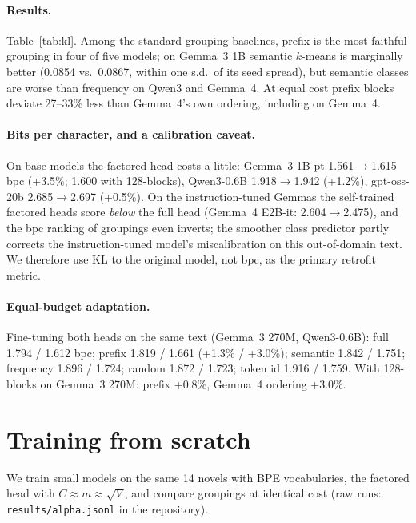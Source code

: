 \documentclass[11pt]{article}
\begin{document}
\paragraph{Results.} Table~\ref{tab:kl}. Among the standard grouping baselines, prefix is the most faithful grouping in four of five models; on Gemma~3 1B semantic $k$-means is marginally better (0.0854 vs.\ 0.0867, within one s.d.\ of its seed spread), but semantic classes are worse than frequency on Qwen3 and Gemma~4. At equal cost prefix blocks deviate 27--33\% less than Gemma~4's own ordering, including on Gemma~4.

\paragraph{Bits per character, and a calibration caveat.} On base models the factored head costs a little: Gemma~3 1B-pt 1.561$\to$1.615 bpc (+3.5\%; 1.600 with 128-blocks), Qwen3-0.6B 1.918$\to$1.942 (+1.2\%), gpt-oss-20b 2.685$\to$2.697 (+0.5\%). On the instruction-tuned Gemmas the self-trained factored heads score \emph{below} the full head (Gemma~4 E2B-it: 2.604$\to$2.475), and the bpc ranking of groupings even inverts; the smoother class predictor partly corrects the instruction-tuned model's miscalibration on this out-of-domain text. We therefore use KL to the original model, not bpc, as the primary retrofit metric.

\paragraph{Equal-budget adaptation.} Fine-tuning both heads on the same text (Gemma~3 270M, Qwen3-0.6B): full 1.794 / 1.612 bpc; prefix 1.819 / 1.661 (+1.3\% / +3.0\%); semantic 1.842 / 1.751; frequency 1.896 / 1.724; random 1.872 / 1.723; token id 1.916 / 1.759. With 128-blocks on Gemma~3 270M: prefix +0.8\%, Gemma~4 ordering +3.0\%.

\section{Training from scratch}\label{sec:scratch}

We train small models on the same 14 novels with BPE vocabularies, the factored head with $C\approx m\approx\sqrt V$, and compare groupings at identical cost (raw runs: \texttt{results/alpha.jsonl} in the repository).
\end{document}
